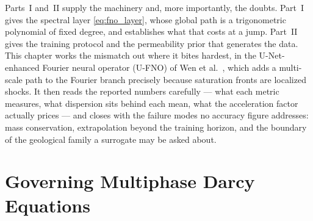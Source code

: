 Parts~I and~II supply the machinery and, more importantly, the doubts. Part~I
gives the spectral layer \eqref{eq:fno_layer}, whose global path is a trigonometric
polynomial of fixed degree, and
 establishes what that
costs at a jump. Part~II gives the training protocol and the permeability prior that
generates the data. This chapter works the mismatch out where it bites hardest, in
the U-Net-enhanced Fourier neural operator (U-FNO) of Wen et al.~\cite{wen2022ufno},
which adds a multi-scale path to the Fourier branch precisely because saturation
fronts are localized shocks. It then reads the reported numbers carefully --- what
each metric measures, what dispersion sits behind each mean, what the acceleration
factor actually prices --- and closes with the failure modes no accuracy figure
addresses: mass conservation, extrapolation beyond the training horizon, and the
boundary of the geological family a surrogate may be asked about.

\section{Governing Multiphase Darcy Equations}

